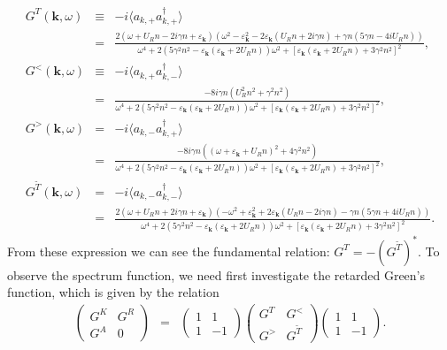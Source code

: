 \documentclass[aps,superscriptaddress,notitlepage,longbibliography]{revtex4-1}
\begin{document}
\begin{eqnarray}
G^{T}(\bm{k},\omega) & \equiv & -i\langle a_{k,+}a_{k,+}^{\dagger}\rangle\nonumber \\
 & = & \frac{2(\omega+U_{R}n-2i\gamma n+\varepsilon_{\bm{k}})(\omega^{2}-\varepsilon_{\bm{k}}^{2}-2\varepsilon_{\bm{k}}(U_{R}n+2i\gamma n)+\gamma n(5\gamma n-4iU_{R}n))}{\omega^{4}+2(5\gamma^{2}n^{2}-\varepsilon_{\bm{k}}(\varepsilon_{\bm{k}}+2U_{R}n))\omega^{2}+[\varepsilon_{\bm{k}}(\varepsilon_{\bm{k}}+2U_{R}n)+3\gamma^{2}n^{2}]^{2}},\\
G^{<}(\bm{k},\omega) & \equiv & -i\langle a_{k,+}a_{k,-}^{\dagger}\rangle\nonumber \\
 & = & \frac{-8i\gamma n(U_{R}^{2}n^{2}+\gamma^{2}n^{2})}{\omega^{4}+2(5\gamma^{2}n^{2}-\varepsilon_{\bm{k}}(\varepsilon_{\bm{k}}+2U_{R}n))\omega^{2}+[\varepsilon_{\bm{k}}(\varepsilon_{\bm{k}}+2U_{R}n)+3\gamma^{2}n^{2}]^{2}},\\
G^{>}(\bm{k},\omega) & = & -i\langle a_{k,-}a_{k,+}^{\dagger}\rangle\nonumber \\
 & = & \frac{-8i\gamma n((\omega+\varepsilon_{\bm{k}}+U_{R}n)^{2}+4\gamma^{2}n^{2})}{\omega^{4}+2(5\gamma^{2}n^{2}-\varepsilon_{\bm{k}}(\varepsilon_{\bm{k}}+2U_{R}n))\omega^{2}+[\varepsilon_{\bm{k}}(\varepsilon_{\bm{k}}+2U_{R}n)+3\gamma^{2}n^{2}]^{2}},\\
G^{\tilde{T}}(\bm{k},\omega) & = & -i\langle a_{k,-}a_{k,-}^{\dagger}\rangle\nonumber \\
 & = & \frac{2(\omega+U_{R}n+2i\gamma n+\varepsilon_{\bm{k}})(-\omega^{2}+\varepsilon_{\bm{k}}^{2}+2\varepsilon_{\bm{k}}(U_{R}n-2i\gamma n)-\gamma n(5\gamma n+4iU_{R}n))}{\omega^{4}+2(5\gamma^{2}n^{2}-\varepsilon_{\bm{k}}(\varepsilon_{\bm{k}}+2U_{R}n))\omega^{2}+[\varepsilon_{\bm{k}}(\varepsilon_{\bm{k}}+2U_{R}n)+3\gamma^{2}n^{2}]^{2}}.
\end{eqnarray}
From these expression we can see the fundamental relation: $G^{T}=-(G^{\tilde{T}})^{\ast}$.
To observe the spectrum function, we need first investigate the retarded
Green's function, which is given by the relation 
\begin{eqnarray}
\left(\begin{array}{cc}
G^{K} & G^{R}\\
G^{A} & 0
\end{array}\right) & = & \left(\begin{array}{cc}
1 & 1\\
1 & -1
\end{array}\right)\left(\begin{array}{cc}
G^{T} & G^{<}\\
G^{>} & G^{\tilde{T}}
\end{array}\right)\left(\begin{array}{cc}
1 & 1\\
1 & -1
\end{array}\right).
\end{eqnarray}
\end{document}
